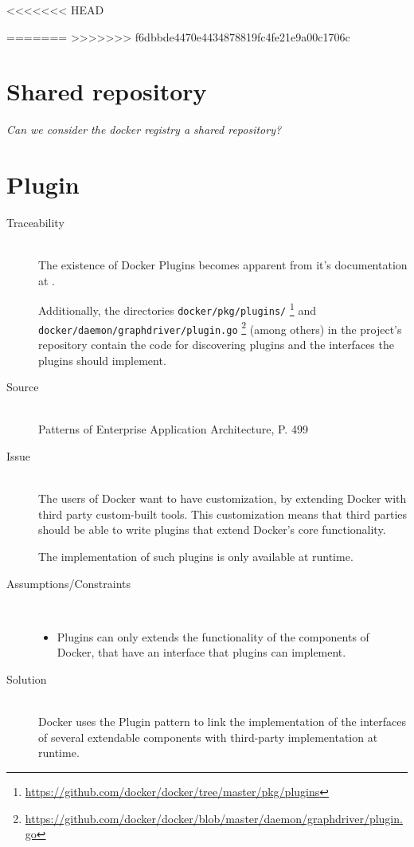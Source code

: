 <<<<<<< HEAD

=======
>>>>>>> f6dbbde4470e4434878819fc4fe21e9a00c1706c
\section{Shared repository}
\textit{Can we consider the docker registry a shared repository?}

\section{Plugin}
\begin{description}

\item [Traceability]~\\
The existence of Docker Plugins becomes apparent from it's documentation at \cite{dockerplugindocs}.

Additionally, the directories \verb|docker/pkg/plugins/| \footnote{\url{https://github.com/docker/docker/tree/master/pkg/plugins}} and \verb|  docker/daemon/graphdriver/plugin.go| \footnote{\url{https://github.com/docker/docker/blob/master/daemon/graphdriver/plugin.go}} (among others) in the project's repository contain the code for discovering plugins and the interfaces the plugins should implement.

\item [Source]~\\
Patterns of Enterprise Application Architecture, P. 499 \cite{eaa}

\item [Issue]~\\
The users of Docker want to have customization, by extending Docker with third party custom-built tools. This customization means that third parties should be able to write plugins that extend Docker's core functionality.\cite{dockerpluginblog}

The implementation of such plugins is only available at runtime.

\item [Assumptions/Constraints]~
\begin{itemize}
\item Plugins can only extends the functionality of the components of Docker, that have an interface that plugins can implement.
\end{itemize}


\item [Solution]~\\
Docker uses the Plugin pattern to link the implementation of the interfaces of several extendable components with third-party implementation at runtime.


\end{description}

